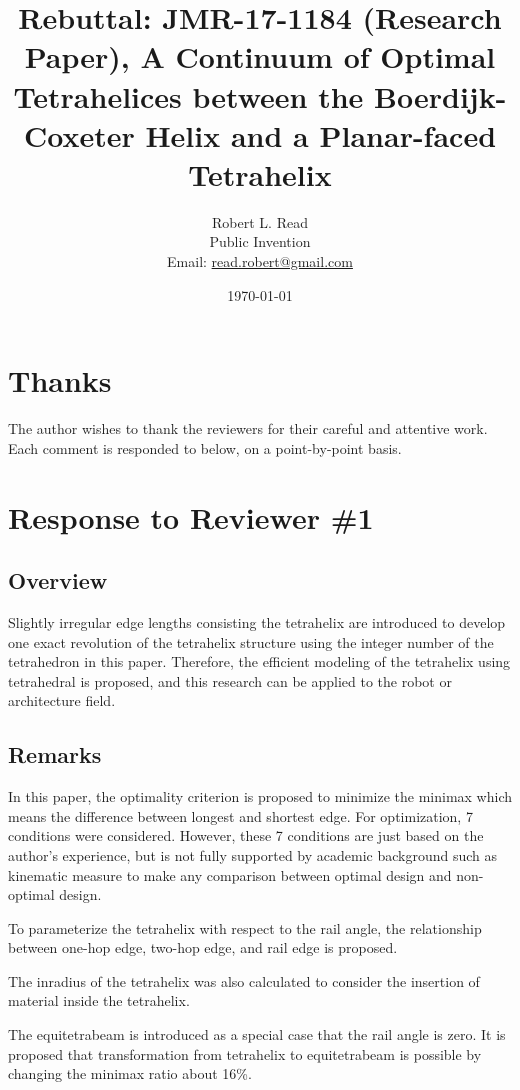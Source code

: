 \documentclass{article}
\title{Rebuttal: JMR-17-1184 (Research Paper), A Continuum of Optimal Tetrahelices between the Boerdijk-Coxeter Helix and a Planar-faced Tetrahelix}
\author{Robert L. Read \\
  Public Invention \\
    Email: \href{mailto:read.robert@gmail.com}{read.robert@gmail.com}   
	}
\date{\today}
\begin{document}
\maketitle

\section{Thanks}

The author wishes to thank the reviewers for their careful and attentive work. Each comment is responded
to below, on a point-by-point basis.

\section{Response to Reviewer \#1}

\subsection{Overview}

Slightly irregular edge lengths consisting the tetrahelix are introduced to develop one exact
revolution of the tetrahelix structure using the integer number of the tetrahedron in this paper.
Therefore, the efficient modeling of the tetrahelix using tetrahedral is proposed, and this research
can be applied to the robot or architecture field.

\subsection{Remarks}

In this paper, the optimality criterion is proposed to minimize the minimax which means the
difference between longest and shortest edge. For optimization, 7 conditions were considered.
However, these 7 conditions are just based on the author’s experience, but is not fully supported
by academic background such as kinematic measure to make any comparison between optimal
design and non-optimal design.

To parameterize the tetrahelix with respect to the rail angle, the relationship between one-hop edge,
two-hop edge, and rail edge is proposed.

The inradius of the tetrahelix was also calculated to consider the insertion of material inside the
tetrahelix.

The equitetrabeam is introduced as a special case that the rail angle is zero. It is proposed that
transformation from tetrahelix to equitetrabeam is possible by changing the minimax ratio about
16\%.
\end{document}
